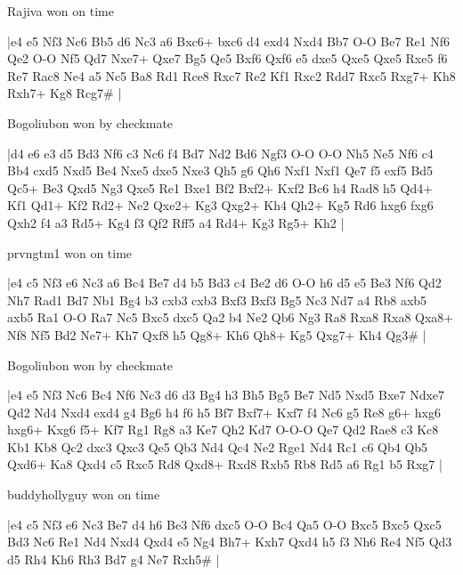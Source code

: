 \showboard

Rajiva won on time

\makegametitle
|e4 e5 Nf3 Nc6 Bb5 d6 Nc3 a6 Bxc6+ bxc6 d4 exd4 Nxd4 Bb7 O-O Be7 Re1 Nf6 Qe2 O-O Nf5 Qd7 Nxe7+ Qxe7 Bg5 Qe5 Bxf6 Qxf6 e5 dxe5 Qxe5 Qxe5 Rxe5 f6 Re7 Rac8 Ne4 a5 Nc5 Ba8 Rd1 Rce8 Rxc7 Re2 Kf1 Rxc2 Rdd7 Rxc5 Rxg7+ Kh8 Rxh7+ Kg8 Rcg7\#  |

\showboard

Bogoliubon won by checkmate

\makegametitle
|d4 e6 e3 d5 Bd3 Nf6 c3 Nc6 f4 Bd7 Nd2 Bd6 Ngf3 O-O O-O Nh5 Ne5 Nf6 c4 Bb4 cxd5 Nxd5 Be4 Nxe5 dxe5 Nxe3 Qh5 g6 Qh6 Nxf1 Nxf1 Qe7 f5 exf5 Bd5 Qc5+ Be3 Qxd5 Ng3 Qxe5 Re1 Bxe1 Bf2 Bxf2+ Kxf2 Bc6 h4 Rad8 h5 Qd4+ Kf1 Qd1+ Kf2 Rd2+ Ne2 Qxe2+ Kg3 Qxg2+ Kh4 Qh2+ Kg5 Rd6 hxg6 fxg6 Qxh2 f4 a3 Rd5+ Kg4 f3 Qf2 Rff5 a4 Rd4+ Kg3 Rg5+ Kh2  |

\showboard

prvngtm1 won on time

\makegametitle
|e4 c5 Nf3 e6 Nc3 a6 Bc4 Be7 d4 b5 Bd3 c4 Be2 d6 O-O h6 d5 e5 Be3 Nf6 Qd2 Nh7 Rad1 Bd7 Nb1 Bg4 b3 cxb3 cxb3 Bxf3 Bxf3 Bg5 Nc3 Nd7 a4 Rb8 axb5 axb5 Ra1 O-O Ra7 Nc5 Bxc5 dxc5 Qa2 b4 Ne2 Qb6 Ng3 Ra8 Rxa8 Rxa8 Qxa8+ Nf8 Nf5 Bd2 Ne7+ Kh7 Qxf8 h5 Qg8+ Kh6 Qh8+ Kg5 Qxg7+ Kh4 Qg3\#  |

\showboard

Bogoliubon won by checkmate

\makegametitle
|e4 e5 Nf3 Nc6 Bc4 Nf6 Nc3 d6 d3 Bg4 h3 Bh5 Bg5 Be7 Nd5 Nxd5 Bxe7 Ndxe7 Qd2 Nd4 Nxd4 exd4 g4 Bg6 h4 f6 h5 Bf7 Bxf7+ Kxf7 f4 Nc6 g5 Re8 g6+ hxg6 hxg6+ Kxg6 f5+ Kf7 Rg1 Rg8 a3 Ke7 Qh2 Kd7 O-O-O Qe7 Qd2 Rae8 c3 Kc8 Kb1 Kb8 Qc2 dxc3 Qxc3 Qe5 Qb3 Nd4 Qc4 Ne2 Rge1 Nd4 Rc1 c6 Qb4 Qb5 Qxd6+ Ka8 Qxd4 c5 Rxc5 Rd8 Qxd8+ Rxd8 Rxb5 Rb8 Rd5 a6 Rg1 b5 Rxg7  |

\showboard

buddyhollyguy won on time

\makegametitle
|e4 c5 Nf3 e6 Nc3 Be7 d4 h6 Be3 Nf6 dxc5 O-O Bc4 Qa5 O-O Bxc5 Bxc5 Qxc5 Bd3 Nc6 Re1 Nd4 Nxd4 Qxd4 e5 Ng4 Bh7+ Kxh7 Qxd4 h5 f3 Nh6 Re4 Nf5 Qd3 d5 Rh4 Kh6 Rh3 Bd7 g4 Ne7 Rxh5\#  |


